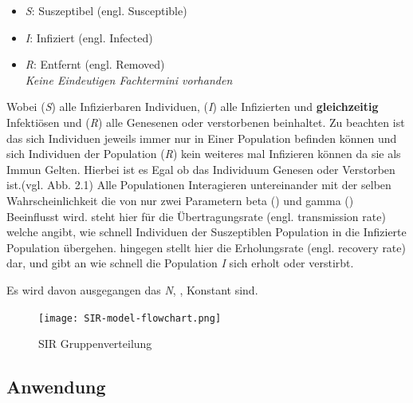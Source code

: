 \documentclass[12pt]{scrartcl} %
\begin{document}
\begin{itemize}
	\item \textit{S}: Suszeptibel (engl. Susceptible)
	\item \textit{I}: Infiziert (engl. Infected)
	\item \textit{R}: Entfernt (engl. Removed)\\
	\small \textsl{Keine Eindeutigen Fachtermini vorhanden}
\end{itemize}
\normalsize

Wobei (\textit{S}) alle Infizierbaren Individuen, (\textit{I}) alle Infizierten und \textbf{gleichzeitig} Infektiösen und (\textit{R}) alle Genesenen oder verstorbenen beinhaltet.  Zu beachten ist das sich Individuen jeweils immer nur in Einer Population befinden können und sich Individuen der Population 
(\textit{R}) kein weiteres mal Infizieren können da sie als Immun Gelten. Hierbei ist es Egal ob das Individuum Genesen oder Verstorben ist.(vgl. Abb. 2.1) \cite[vgl.]{4}
Alle Populationen Interagieren untereinander mit der selben Wahrscheinlichkeit die von nur zwei Parametern beta (\textbeta) und gamma (\textgamma) Beeinflusst wird. 
\textbeta \space steht hier für die Übertragungsrate (engl. transmission rate) welche angibt, wie schnell Individuen der Suszeptiblen Population in die Infizierte Population übergehen. 
\textgamma \space hingegen stellt hier die Erholungsrate (engl. recovery rate) dar, und gibt an wie schnell die Population \textit{I} sich erholt oder verstirbt.

Es wird davon ausgegangen das \textit{N}, \textbeta, \textgamma \space Konstant sind.

	\begin{figure}[h]
	\centering
	\texttt{[image: SIR-model-flowchart.png]} 
	\caption{SIR Gruppenverteilung}
	\end{figure}


\subsection{Anwendung}
\end{document}
